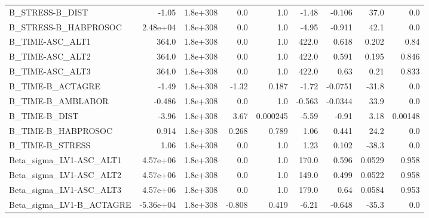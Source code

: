 \begin{tabular}{lrrrrrrrr}
B\_STRESS-B\_DIST                   &       -1.05 &     1.8e+308 &      0.0 &      1.0 &      -1.48 &      -0.106 &         37.0 &           0.0 \\
B\_STRESS-B\_HABPROSOC              &    2.48e+04 &     1.8e+308 &      0.0 &      1.0 &      -4.95 &      -0.911 &         42.1 &           0.0 \\
B\_TIME-ASC\_ALT1                   &       364.0 &     1.8e+308 &      0.0 &      1.0 &      422.0 &       0.618 &        0.202 &          0.84 \\
B\_TIME-ASC\_ALT2                   &       364.0 &     1.8e+308 &      0.0 &      1.0 &      422.0 &       0.591 &        0.195 &         0.846 \\
B\_TIME-ASC\_ALT3                   &       364.0 &     1.8e+308 &      0.0 &      1.0 &      422.0 &        0.63 &         0.21 &         0.833 \\
B\_TIME-B\_ACTAGRE                  &       -1.49 &     1.8e+308 &    -1.32 &    0.187 &      -1.72 &     -0.0751 &        -31.8 &           0.0 \\
B\_TIME-B\_AMBLABOR                 &      -0.486 &     1.8e+308 &      0.0 &      1.0 &     -0.563 &     -0.0344 &         33.9 &           0.0 \\
B\_TIME-B\_DIST                     &       -3.96 &     1.8e+308 &     3.67 & 0.000245 &      -5.59 &       -0.91 &         3.18 &       0.00148 \\
B\_TIME-B\_HABPROSOC                &       0.914 &     1.8e+308 &    0.268 &    0.789 &       1.06 &       0.441 &         24.2 &           0.0 \\
B\_TIME-B\_STRESS                   &        1.06 &     1.8e+308 &      0.0 &      1.0 &       1.23 &       0.102 &        -38.3 &           0.0 \\
Beta\_sigma\_LV1-ASC\_ALT1           &    4.57e+06 &     1.8e+308 &      0.0 &      1.0 &      170.0 &       0.596 &       0.0529 &         0.958 \\
Beta\_sigma\_LV1-ASC\_ALT2           &    4.57e+06 &     1.8e+308 &      0.0 &      1.0 &      149.0 &       0.499 &       0.0522 &         0.958 \\
Beta\_sigma\_LV1-ASC\_ALT3           &    4.57e+06 &     1.8e+308 &      0.0 &      1.0 &      179.0 &        0.64 &       0.0584 &         0.953 \\
Beta\_sigma\_LV1-B\_ACTAGRE          &   -5.36e+04 &     1.8e+308 &   -0.808 &    0.419 &      -6.21 &      -0.648 &        -35.3 &           0.0 \\

\end{tabular}

